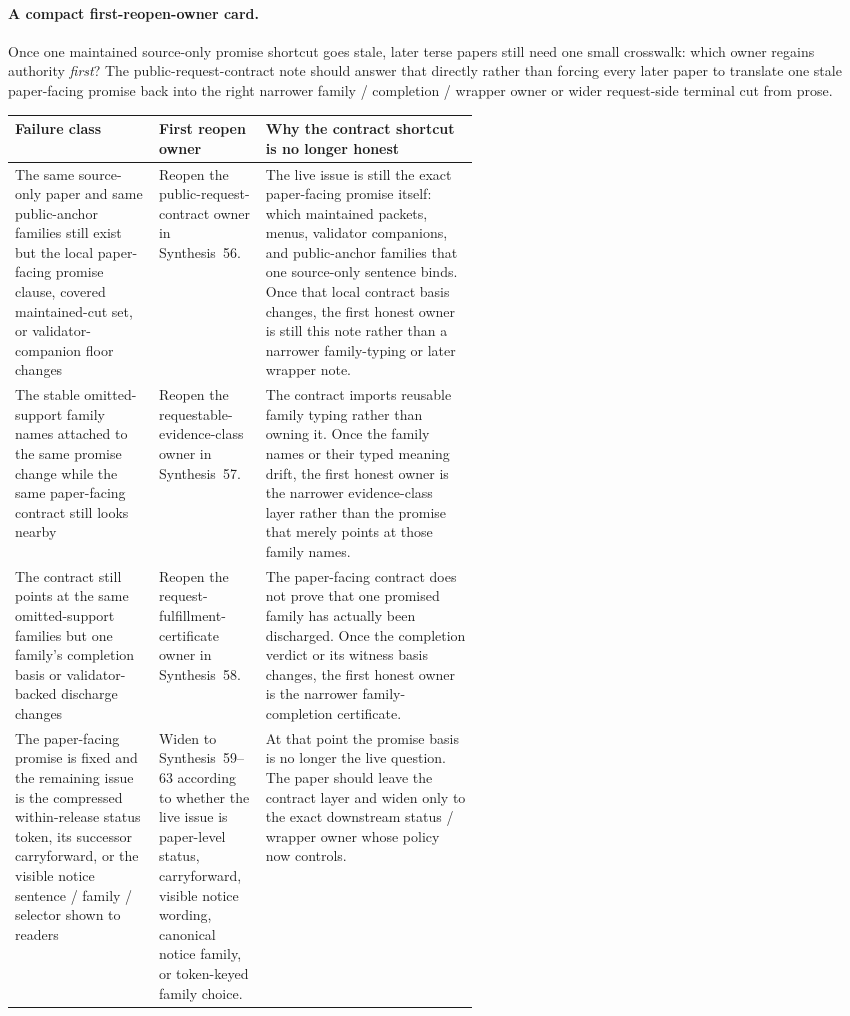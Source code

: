 \documentclass[11pt]{article}
\begin{document}
\paragraph{A compact first-reopen-owner card.}
Once one maintained source-only promise shortcut goes stale, later terse papers still need one small crosswalk: which owner regains authority \emph{first}? The public-request-contract note should answer that directly rather than forcing every later paper to translate one stale paper-facing promise back into the right narrower family / completion / wrapper owner or wider request-side terminal cut from prose.

\begin{table}[t]
\centering
\small
\begin{tabularx}{\linewidth}{@{}p{0.31\linewidth}p{0.23\linewidth}X@{}}
\toprule
Failure class & First reopen owner & Why the contract shortcut is no longer honest \\
\midrule
The same source-only paper and same public-anchor families still exist but the local paper-facing promise clause, covered maintained-cut set, or validator-companion floor changes & Reopen the public-request-contract owner in Synthesis~56. & The live issue is still the exact paper-facing promise itself: which maintained packets, menus, validator companions, and public-anchor families that one source-only sentence binds. Once that local contract basis changes, the first honest owner is still this note rather than a narrower family-typing or later wrapper note. \\
The stable omitted-support family names attached to the same promise change while the same paper-facing contract still looks nearby & Reopen the requestable-evidence-class owner in Synthesis~57. & The contract imports reusable family typing rather than owning it. Once the family names or their typed meaning drift, the first honest owner is the narrower evidence-class layer rather than the promise that merely points at those family names. \\
The contract still points at the same omitted-support families but one family's completion basis or validator-backed discharge changes & Reopen the request-fulfillment-certificate owner in Synthesis~58. & The paper-facing contract does not prove that one promised family has actually been discharged. Once the completion verdict or its witness basis changes, the first honest owner is the narrower family-completion certificate. \\
The paper-facing promise is fixed and the remaining issue is the compressed within-release status token, its successor carryforward, or the visible notice sentence / family / selector shown to readers & Widen to Synthesis~59--63 according to whether the live issue is paper-level status, carryforward, visible notice wording, canonical notice family, or token-keyed family choice. & At that point the promise basis is no longer the live question. The paper should leave the contract layer and widen only to the exact downstream status / wrapper owner whose policy now controls. \\

\end{tabularx}
\end{table}
\end{document}
